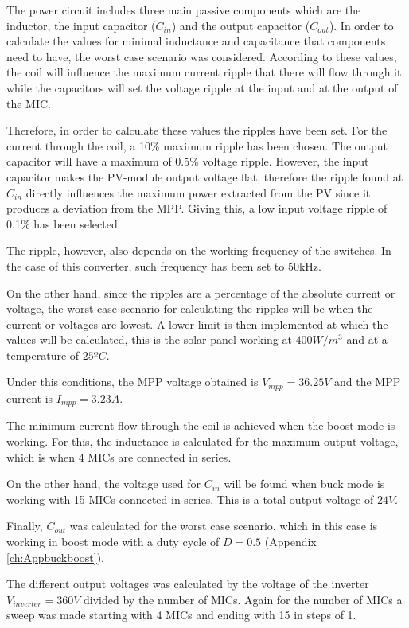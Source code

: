 The power circuit includes three main passive components which are the inductor, the input capacitor ($C_{in}$) and the output capacitor ($C_{out}$). In order to calculate the values for minimal inductance and capacitance that components need to have, the worst case scenario was considered. According to these values, the coil will influence the maximum current ripple that there will flow through it while the capacitors will set the voltage ripple at the input and at the output of the MIC. 

Therefore, in order to calculate these values the ripples have been set. For the current through the coil, a 10\% maximum ripple has been chosen. The output capacitor will  have a maximum of 0.5\% voltage ripple. However, the input capacitor makes the PV-module output voltage flat, therefore the ripple found at $C_{in}$ directly influences the maximum power extracted from the PV since it produces a deviation from the MPP. Giving this, a low input voltage ripple of 0.1\% has been selected.

The ripple, however, also depends on the working frequency of the switches. In the case of this converter, such frequency has been set to 50kHz. 

On the other hand, since the ripples are a percentage of the absolute current or voltage, the worst case scenario for calculating the ripples will be when the current or voltages are lowest. A lower limit is then implemented at which the values will be calculated, this is the solar panel working at $400 W/m^3$ and at a temperature of $25 ºC$.

Under this conditions, the MPP voltage obtained is $V_{mpp} = 36.25V$ and the MPP current is $I_{mpp} = 3.23A$.

The minimum current flow through the coil is achieved when the boost mode is working. For this, the inductance is calculated for the maximum output voltage, which is when 4 MICs are connected in series.

On the other hand, the voltage used for $C_{in}$ will be found when buck mode is working with 15 MICs connected in series. This is a total output voltage of $24 V$.

Finally, $C_{out}$ was calculated for the worst case scenario, which in this case is working in boost mode with a duty cycle of $D = 0.5$ (Appendix \ref{ch:Appbuckboost}).


The different output voltages was calculated by the voltage of the inverter $V_{inverter}=360V$ divided by the number of MICs. Again for the number of MICs a sweep was made starting with 4 MICs and ending with 15 in steps of 1.

